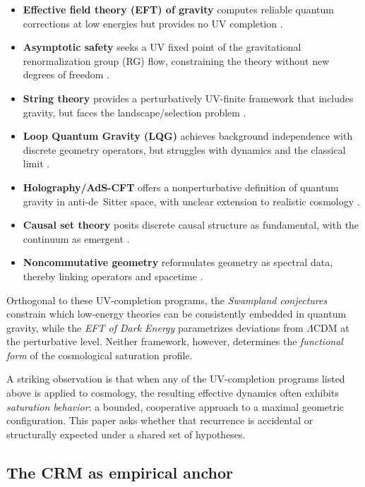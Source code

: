 \documentclass[aps,prd,twocolumn,superscriptaddress,nofootinbib]{revtex4-2}
\begin{document}
\begin{itemize}
\item \textbf{Effective field theory (EFT) of gravity} computes reliable quantum corrections at low energies but provides no UV completion \cite{Donoghue1994}.
\item \textbf{Asymptotic safety} seeks a UV fixed point of the gravitational renormalization group (RG) flow, constraining the theory without new degrees of freedom \cite{Weinberg1979,Reuter1998,Percacci2017}.
\item \textbf{String theory} provides a perturbatively UV-finite framework that includes gravity, but faces the landscape/selection problem \cite{Polchinski1998}.
\item \textbf{Loop Quantum Gravity (LQG)} achieves background independence with discrete geometry operators, but struggles with dynamics and the classical limit \cite{Rovelli2004,Thiemann2007}.
\item \textbf{Holography/AdS-CFT} offers a nonperturbative definition of quantum gravity in anti-de~Sitter space, with unclear extension to realistic cosmology \cite{Maldacena1999}.
\item \textbf{Causal set theory} posits discrete causal structure as fundamental, with the continuum as emergent \cite{Sorkin2003,Surya2019}.
\item \textbf{Noncommutative geometry} reformulates geometry as spectral data, thereby linking operators and spacetime \cite{Connes1994}.
\end{itemize}

Orthogonal to these UV-completion programs, the \textit{Swampland conjectures} \cite{Obied2018} constrain which low-energy theories can be consistently embedded in quantum gravity, while the \textit{EFT of Dark Energy} \cite{Gubitosi2013} parametrizes deviations from $\Lambda$CDM at the perturbative level. Neither framework, however, determines the \textit{functional form} of the cosmological saturation profile.

A striking observation is that when any of the UV-completion programs listed above is applied to cosmology, the resulting effective dynamics often exhibits \textit{saturation behavior}: a bounded, cooperative approach to a maximal geometric configuration. This paper asks whether that recurrence is accidental or structurally expected under a shared set of hypotheses.

\subsection{The CRM as empirical anchor}
\end{document}
